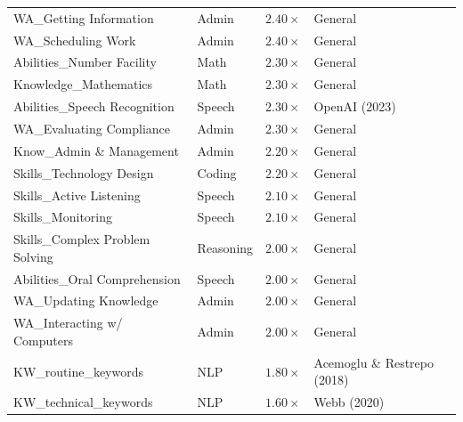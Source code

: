 \begin{table}[htbp]
\begin{tabular}{llcl}
WA\_Getting Information & Admin & $2.40\times$ & General \\
WA\_Scheduling Work & Admin & $2.40\times$ & General \\
Abilities\_Number Facility & Math & $2.30\times$ & General \\
Knowledge\_Mathematics & Math & $2.30\times$ & General \\
Abilities\_Speech Recognition & Speech & $2.30\times$ & OpenAI (2023) \\
WA\_Evaluating Compliance & Admin & $2.30\times$ & General \\
Know\_Admin \& Management & Admin & $2.20\times$ & General \\
Skills\_Technology Design & Coding & $2.20\times$ & General \\
Skills\_Active Listening & Speech & $2.10\times$ & General \\
Skills\_Monitoring & Speech & $2.10\times$ & General \\
Skills\_Complex Problem Solving & Reasoning & $2.00\times$ & General \\
Abilities\_Oral Comprehension & Speech & $2.00\times$ & General \\
WA\_Updating Knowledge & Admin & $2.00\times$ & General \\
WA\_Interacting w/ Computers & Admin & $2.00\times$ & General \\
KW\_routine\_keywords & NLP & $1.80\times$ & Acemoglu \& Restrepo (2018) \\
KW\_technical\_keywords & NLP & $1.60\times$ & Webb (2020) \\
\bottomrule
\end{tabular}
\end{table}

